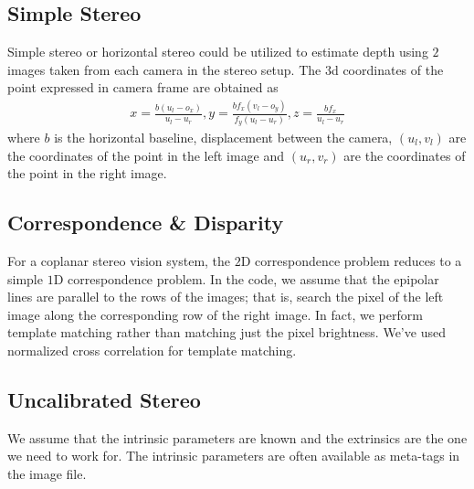 \documentclass{report}
\begin{document}
\subsection{Simple Stereo}
\hspace{\parindent}Simple stereo or horizontal stereo could be utilized to estimate depth using $2$ images taken from each camera in the stereo setup. The $3$d coordinates of the point expressed in camera frame are obtained as
\begin{align}
	x =\frac{b (u_l - o_x)}{u_l - u_r}, y = \frac{b f_x (v_l - o_y)}{f_y (u_l - u_r)}, z = \frac{b f_x}{u_l - u_r}
\end{align}
where $b$ is the horizontal baseline, displacement between the camera, $(u_l, v_l)$ are the coordinates of the point in the left image and $(u_r, v_r)$ are the coordinates of the point in the right image.


\subsection{Correspondence \& Disparity}
\hspace{\parindent}For a coplanar stereo vision system, the $2$D correspondence problem reduces to a simple $1$D correspondence problem. In the code, we assume that the epipolar lines are parallel to the rows of the images; that is, search the pixel of the left image along the corresponding row of the right image. In fact, we perform template matching rather than matching just the pixel brightness. We've used normalized cross correlation for template matching.


\subsection{Uncalibrated Stereo}
\hspace{\parindent}We assume that the intrinsic parameters are known and the extrinsics are the one we need to work for. The intrinsic parameters are often available as meta-tags in the image file.

\end{document}

